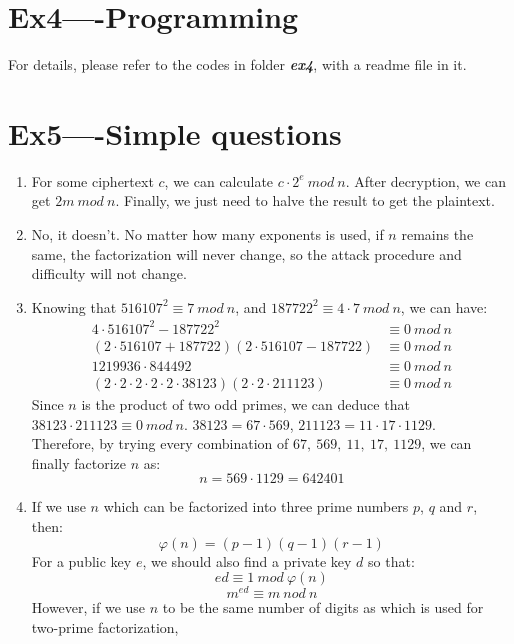\documentclass[12pt, a4paper]{article}
\begin{document}
\begin{enumerate}
\end{enumerate}

\section*{Ex4----Programming}
For details, please refer to the codes in folder \textbf{\emph{ex4}}, with a readme file in it.

\section*{Ex5----Simple questions}
\begin{enumerate}
    \item For some ciphertext $c$, we can calculate $c\cdot 2^e\ mod\ n$. After decryption, 
          we can get $2m\ mod\ n$. Finally, we just need to halve the result to get the plaintext.
    \item No, it doesn't. No matter how many exponents is used, if $n$ remains the same, 
          the factorization will never change, so the attack procedure and difficulty will not change.
    \item Knowing that $516107^2 \equiv 7\ mod\ n$, and $187722^2 \equiv 4\cdot7\ mod\ n$, we can have:
          \begin{align*}
              4\cdot 516107^2 - 187722^2 &\equiv 0\ mod\ n\\
              (2\cdot 516107 + 187722)(2\cdot 516107 - 187722) &\equiv 0\ mod\ n\\
              1219936 \cdot 844492 &\equiv 0\ mod\ n\\
              (2\cdot 2\cdot 2\cdot 2\cdot 2\cdot 38123)(2\cdot 2\cdot 211123) &\equiv 0\ mod\ n 
          \end{align*}
          Since $n$ is the product of two odd primes, we can deduce that $38123\cdot 211123 \equiv 0\ mod\ n$.
          $38123 = 67\cdot 569$, $211123 = 11\cdot 17\cdot 1129$.\\
          Therefore, by trying every combination of $67,\ 569,\ 11,\ 17,\ 1129$, 
          we can finally factorize $n$ as:
          $$n = 569\cdot 1129 = 642401$$
    \item If we use $n$ which can be factorized into three prime numbers $p$, $q$ and $r$, then:
          $$\varphi(n) = (p-1)(q-1)(r-1)$$
          For a public key $e$, we should also find a private key $d$ so that:
          $$ed \equiv 1\ mod\ \varphi(n)$$
          $$m^{ed} \equiv m\ nod\ n$$
          However, if we use $n$ to be the same number of digits as which is used for two-prime factorization, 

\end{enumerate}
\end{document}
